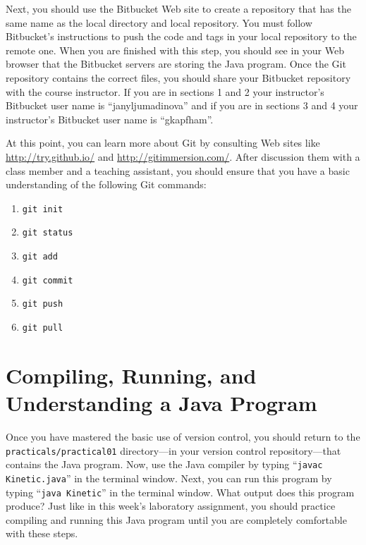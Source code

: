 Next, you should use the Bitbucket Web site to create a repository that has the same name as the local directory and
local repository.  You must follow Bitbucket's instructions to push the code and tags in your local repository to the
remote one. When you are finished with this step, you should see in your Web browser that the Bitbucket servers are
storing the Java program. Once the Git repository contains the correct files, you should share your Bitbucket repository
with the course instructor. If you are in sections 1 and 2 your instructor's Bitbucket user name is ``janyljumadinova'' and if you are in sections 3 and 4 your instructor's Bitbucket user name is ``gkapfham''.

At this point, you can learn more about Git by consulting Web sites like \url{http://try.github.io/} and
\url{http://gitimmersion.com/}.  After discussion them with a class member and a teaching assistant, you should ensure
that you have a basic understanding of the following Git commands:

\vspace*{-.125in}
\begin{enumerate} 
  \item {\tt git init}
  \item {\tt git status}
  \item {\tt git add} 
  \item {\tt git commit}
  \item {\tt git push}
  \item {\tt git pull} 
\end{enumerate}
\vspace*{-.125in}

\section*{Compiling, Running, and Understanding a Java Program}

Once you have mastered the basic use of version control, you should return to the \\ {\tt practicals/practical01}
directory---in your version control repository---that contains the Java program. Now, use the Java compiler by typing
``{\tt javac Kinetic.java}'' in the terminal window.  Next, you can run this program by typing ``{\tt java Kinetic}'' in
the terminal window.  What output does this program produce?  Just like in this week's laboratory assignment, you should
practice compiling and running this Java program until you are completely comfortable with these steps.

